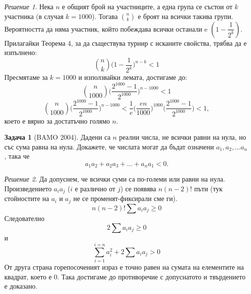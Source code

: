 \documentclass[11 pt, a4paper]{article}
\theoremstyle{definition}
\newtheorem{p}{Задача}
\theoremstyle{remark}
\newtheorem*{s}{Решение}
\begin{document}
\begin{s}
Нека $n$ е общият брой на участниците, а една група се състои от $k$ участника (в случая $k=1000$). Тогава ${n}\choose{k}$ е броят на всички такива групи. Вероятността да няма участник, който побеждава всички останали e $(1-\dfrac{1}{2^k})$. Прилагайки Теорема 4, за да съществува турнир с исканите свойства, трябва да е изпълнено:
\begin{equation*}
{{n}\choose{k}}\Big(1-\dfrac{1}{2^k}\Big)^{n-k}<1
\end{equation*}
Пресмятаме за $k=1000$ и използвайки лемата, достигаме до:
\begin{equation*}
{{n}\choose{1000}}\Big({\dfrac{2^{1000}-1}{2^{1000}}}\Big)^{n-1000}<1
\end{equation*}
\begin{equation*}
{{n}\choose{1000}}\Big({\dfrac{2^{1000}-1}{2^{1000}}}\Big)^{n-1000}<\dfrac{1}{e}\Big(\dfrac{en}{1000}\Big)^{1000}\Big({\dfrac{2^{1000}-1}{2^{1000}}}\Big)<1,
\end{equation*}
което е вярно за достатъчно голямо $n$.
\end{s}
\begin{p}[BAMO 2004]

Дадени са $n$ реални числа, не всички равни на нула, но  със сума равна на нула. Докажете, че числата могат да бъдат означени $a_1, a_2,\dots a_n$, така че\\
\begin{equation*}
a_1 a_2+a_2 a_3+\dots+a_n a_1<0.
\end{equation*}
\end{p}
\begin{s}
Да допуснем, че всички суми са по-големи или равни на нула. Произведението $a_i a_j$ ($i$ е различно от $j$) се появява $n(n-2)!$ пъти (тук стойностите на $a_i$ и $a_j$ не се променят-фиксирали сме ги).\\
\begin{equation*}
    n(n-2)!\sum a_i a_j\geq0
\end{equation*}
Следователно
\begin{equation*}
2\sum a_i a_j\geq0
\end{equation*}
и 
\begin{equation*}
\sum_{i=1}^{i=n} a_i^2+2\sum a_i a_j>0
\end{equation*}
От друга страна горепосоченият израз е точно равен на сумата на елементите на квадрат, което е $0$. Така достигаме до противоречие с допуснатото и твърдението е доказано.\par
\end{s}
\end{document}

